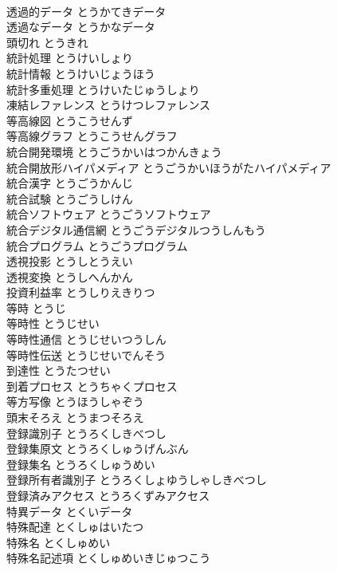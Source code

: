 \documentclass[8pt]{extreport}
\begin{document}
\begin{CJK}{UTF8}{min}
\\	透過的データ	とうかてきデータ	
\\	透過なデータ	とうかなデータ	
\\	頭切れ	とうきれ	
\\	統計処理	とうけいしょり	
\\	統計情報	とうけいじょうほう	
\\	統計多重処理	とうけいたじゅうしょり	
\\	凍結レファレンス	とうけつレファレンス	
\\	等高線図	とうこうせんず	
\\	等高線グラフ	とうこうせんグラフ	
\\	統合開発環境	とうごうかいはつかんきょう	
\\	統合開放形ハイパメディア	とうごうかいほうがたハイパメディア	
\\	統合漢字	とうごうかんじ	
\\	統合試験	とうごうしけん	
\\	統合ソフトウェア	とうごうソフトウェア	
\\	統合デジタル通信網	とうごうデジタルつうしんもう	
\\	統合プログラム	とうごうプログラム	
\\	透視投影	とうしとうえい	
\\	透視変換	とうしへんかん	
\\	投資利益率	とうしりえきりつ	
\\	等時	とうじ	
\\	等時性	とうじせい	
\\	等時性通信	とうじせいつうしん	
\\	等時性伝送	とうじせいでんそう	
\\	到達性	とうたつせい	
\\	到着プロセス	とうちゃくプロセス	
\\	等方写像	とうほうしゃぞう	
\\	頭末そろえ	とうまつそろえ	
\\	登録識別子	とうろくしきべつし	
\\	登録集原文	とうろくしゅうげんぶん	
\\	登録集名	とうろくしゅうめい	
\\	登録所有者識別子	とうろくしょゆうしゃしきべつし	
\\	登録済みアクセス	とうろくずみアクセス	
\\	特異データ	とくいデータ	
\\	特殊配達	とくしゅはいたつ	
\\	特殊名	とくしゅめい	
\\	特殊名記述項	とくしゅめいきじゅつこう	

\end{CJK}
\end{document}
